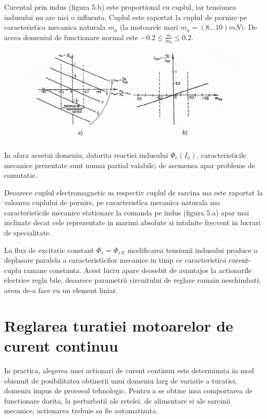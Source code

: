 \documentclass[11pt]{article}
\begin{document}
Curentul prin indus (figura 5.b) este proportional cu cuplul, iar tensiunea indusului nu are nici o influenta. Cuplul este raportat la cuplul de pornire pe caracteristica mecanica naturala $m_a$ (la motoarele mari $m_a = (8 ... 10)mN)$. De aceea domeniul de functionare normal este $-0.2 \leq \frac{m}{m_0}\leq 0.2$.
\begin{figure}[H]
	\centering
	\includegraphics[width=.8\linewidth]{fig6.png}
	\label{fig:test2}
\end{figure}
In afara acestui domeniu, datorita reactiei indusului $\Phi_{e}(I_a)$, caracteristicile mecanice prezentate sunt numai partial valabile; de asemenea apar probleme de comutatie. 

Deoarece cuplul electromagnetic m respectiv cuplul de sarcina ma este raportat la valoarea cuplului de pornire, pe caracteristica mecanica naturala mo caracteristicile mecanice stationare la comanda pe indus (figura 5.a) apar mai inclinate decat cele reprezentate in marimi absolute si intalnite frecvent in lucrari de specialitate.

La flux de excitatie constant $\Phi_{e}=\Phi_{eN}$ modificarea tensiunii indusului produce o deplasare paralela a caracteristicilor mecanice in timp ce caracteristica curent-cuplu ramane constanta. Acest lucru apare deosebit de avantajos la actionarile electrice regla bile, deoarece parametrii circuitului de reglare ramain neschimbati; avem de-a face cu un element liniar. 
\section{Reglarea turatiei motoarelor de curent continuu}
In practica, alegerea unei actionari de curent continuu este determinata in mod obisnuit de posibilitatea obtinerii unui domeniu larg de variatie a turatiei, domeniu impus de procesul tehnologic. Pentru a se obtine insa comportarea de functionare dorita, la perturbatii ale retelei. de alimentare si ale sarcinii mecanice, actionarea trebuie sa fie automatizata. 
\end{document}
